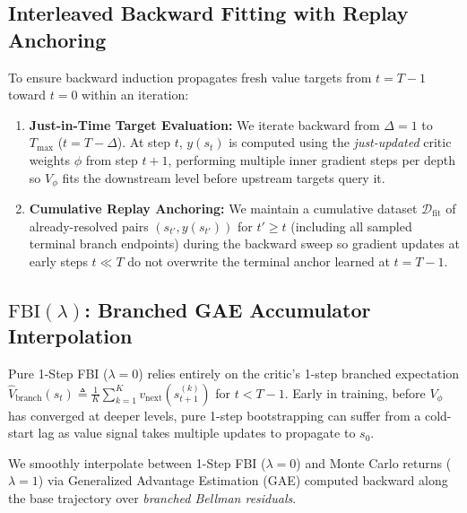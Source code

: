 \documentclass[11pt,a4paper]{article}
\begin{document}
\subsection{Interleaved Backward Fitting with Replay Anchoring}
To ensure backward induction propagates fresh value targets from $t = T-1$ toward $t = 0$ within an iteration:
\begin{enumerate}
    \item \textbf{Just-in-Time Target Evaluation:} We iterate backward from $\Delta = 1$ to $T_{\max}$ ($t = T - \Delta$). At step $t$, $y(s_t)$ is computed using the \emph{just-updated} critic weights $\phi$ from step $t+1$, performing multiple inner gradient steps per depth so $V_\phi$ fits the downstream level before upstream targets query it.
    \item \textbf{Cumulative Replay Anchoring:} We maintain a cumulative dataset $\mathcal{D}_{\text{fit}}$ of already-resolved pairs $(s_{t'}, y(s_{t'}))$ for $t' \ge t$ (including all sampled terminal branch endpoints) during the backward sweep so gradient updates at early steps $t \ll T$ do not overwrite the terminal anchor learned at $t = T - 1$.
\end{enumerate}

\subsection{\texorpdfstring{$\text{FBI}(\lambda)$: Branched GAE Accumulator Interpolation}{FBI(lambda): Branched GAE Accumulator Interpolation}}
Pure 1-Step FBI ($\lambda = 0$) relies entirely on the critic's 1-step branched expectation $\hat{V}_{\text{branch}}(s_t) \triangleq \frac{1}{K}\sum_{k=1}^K v_{\text{next}}(s_{t+1}^{(k)})$ for $t < T - 1$. Early in training, before $V_\phi$ has converged at deeper levels, pure 1-step bootstrapping can suffer from a cold-start lag as value signal takes multiple updates to propagate to $s_0$.

We smoothly interpolate between 1-Step FBI ($\lambda = 0$) and Monte Carlo returns ($\lambda = 1$) via Generalized Advantage Estimation (GAE) computed backward along the base trajectory over \emph{branched Bellman residuals}.
\end{document}
